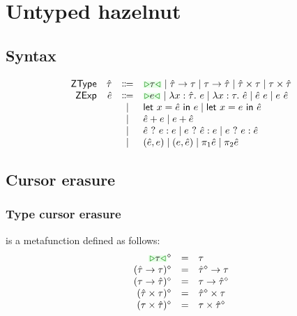 \documentclass[formalism.tex]{subfiles}
\begin{document}




\section{Untyped hazelnut}
\label{sec:untyped}

\subsection{Syntax}
\label{sec:untyped-syntax}
\[\begin{array}{rrcl}
  \ZTMName & \ZTMV & \Coloneqq & \ZTCursor{\TMV} \mid \ZTArrowL{\ZTMV}{\TMV} \mid \ZTArrowR{\TMV}{\ZTMV} \mid \ZTProdL{\ZTMV}{\TMV} \mid \ZTProdR{\TMV}{\ZTMV} \\
  \ZMName  & \ZMV  & \Coloneqq & \ZCursor{\EMV} \mid \ZLamT{x}{\ZTMV}{\EMV} \mid \ZLamE{x}{\TMV}{\ZMV} \mid \ZApL{\ZMV}{\EMV} \mid \ZApR{\EMV}{\ZMV} \\
           &       & \mid         & \ZLetL{x}{\ZMV}{\EMV} \mid \ZLetR{x}{\EMV}{\ZMV} \\
           &       & \mid         & \ZPlusL{\ZMV}{\EMV} \mid \ZPlusR{\EMV}{\ZMV} \\
           &       & \mid         & \ZIfC{\ZMV}{\EMV}{\EMV} \mid \ZIfL{\EMV}{\ZMV}{\EMV} \mid \ZIfR{\EMV}{\EMV}{\ZMV} \\
           &       & \mid         & \ZPairL{\ZMV}{\EMV} \mid \ZPairR{\EMV}{\ZMV} \mid \ZProjL{\ZMV} \mid \ZProjR{\ZMV} \\
\end{array}\]

\subsection{Cursor erasure}
\label{sec:untyped-cursor-erasure}

\subsubsection{Type cursor erasure}
\label{sec:untyped-type-cursor-erasure}
\judgbox{\ensuremath{\cursorErase{\ZTMV}}} is a metafunction defined as follows:
%
\newcommand{\cursorErasesToRow}[2]{\ensuremath{\cursorErase{#1} & = & #2}}
\[\begin{array}{rcl}
  \cursorErasesToRow{\ZTCursor{\TMV}}{\TMV} \\
  \cursorErasesToRow{(\ZTArrowL{\ZTMV}{\TMV})}{\TArrow{\cursorErase{\ZTMV}}{\TMV}} \\
  \cursorErasesToRow{(\ZTArrowR{\TMV}{\ZTMV})}{\TArrow{\TMV}{\cursorErase{\ZTMV}}} \\
  \cursorErasesToRow{(\ZTProdL{\ZTMV}{\TMV})}{\TProd{\cursorErase{\ZTMV}}{\TMV}} \\
  \cursorErasesToRow{(\ZTProdR{\TMV}{\ZTMV})}{\TProd{\TMV}{\cursorErase{\ZTMV}}} \\
\end{array}\]
\end{document}
